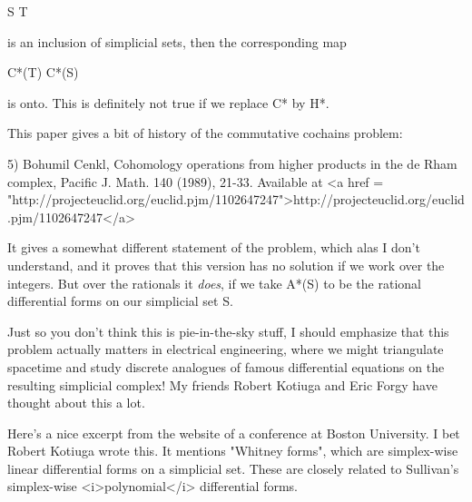 S \to  T

is an inclusion of simplicial sets, then the corresponding map 

C*(T) \to  C*(S)

is onto.  This is definitely not true if we replace C* by H*.  

This paper gives a bit of history of the commutative cochains problem:

5) Bohumil Cenkl, Cohomology operations from higher products in the de
Rham complex, Pacific J. Math. 140 (1989), 21-33.  Available at
<a href = "http://projecteuclid.org/euclid.pjm/1102647247">http://projecteuclid.org/euclid.pjm/1102647247</a>

It gives a somewhat different statement of the problem, which alas I
don't understand, and it proves that this version has no solution if
we work over the integers.  But over the rationals it \emph{does}, if we
take A*(S) to be the rational differential forms on our simplicial set
S.

Just so you don't think this is pie-in-the-sky stuff, I should
emphasize that this problem actually matters in electrical
engineering, where we might triangulate spacetime and study discrete
analogues of famous differential equations on the resulting simplicial
complex!  My friends Robert Kotiuga and Eric Forgy have thought about
this a lot.  

Here's a nice excerpt from the website of a
conference at Boston University.  I bet Robert Kotiuga wrote this.  It
mentions "Whitney forms", which are simplex-wise linear
differential forms on a simplicial set.  These are closely related to
Sullivan's simplex-wise <i>polynomial</i> differential forms.

